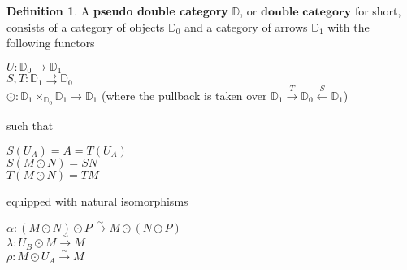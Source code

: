 \documentclass[oneside,final]{ucr}
\theoremstyle{definition}
\newtheorem{definition}[theorem]{Definition}
\newcommand{\define}[1]{{\bf \boldmath #1}}
\begin{document}
{\begin{definition}\label{defn:double_category}
A \define{pseudo double category} $\mathbb{D}$, or $\textbf{double category}$ for short, consists of a category of objects $\mathbb{D}_0$ and a category of arrows $\mathbb{D}_1$ with the following functors
\begin{center}
$U\colon \mathbb{D}_0 \to \mathbb{D}_1$\\
$S,T \colon \mathbb{D}_1 \rightrightarrows \mathbb{D}_0$\\
$\odot \colon \mathbb{D}_1 \times_{\mathbb{D}_0} \mathbb{D}_1 \to \mathbb{D}_1$ (where the pullback is taken over $\mathbb{D}_1 \xrightarrow[]{T} \mathbb{D}_0 \xleftarrow[]{S} \mathbb{D}_1$) \\
\end{center}
 such that \\
\begin{center}
$S(U_{A})=A=T(U_{A})$\\
$S(M \odot N)=SN$\\
$T(M \odot N)=TM$\\
\end{center}
equipped with natural isomorphisms
\begin{center}

$\alpha \colon (M \odot N) \odot P \xrightarrow{\sim} M \odot (N \odot P)$\\
$\lambda \colon U_{B} \odot M \xrightarrow{\sim} M$\\
$\rho \colon M \odot U_{A} \xrightarrow{\sim} M$


\end{center}
\end{definition}}
\end{document}
